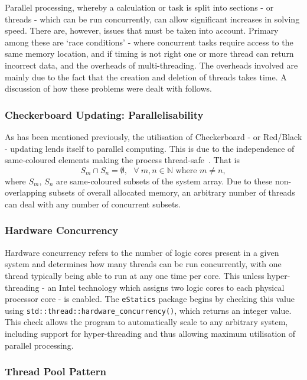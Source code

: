 	Parallel processing, whereby a calculation or task is split into sections - or threads - which can be run concurrently, can allow significant increases in solving speed. There are, however, issues that must be taken into account. Primary among these are `race conditions' - where concurrent tasks require access to the same memory location, and if timing is not right one or more thread can return incorrect data, and the overheads of multi-threading. The overheads involved are mainly due to the fact that the creation and deletion of threads takes time. A discussion of how these problems were dealt with follows.
		
		\subsubsection{Checkerboard Updating: Parallelisability}
		
		As has been mentioned previously, the utilisation of Checkerboard - or Red/Black - updating lends itself to parallel computing. This is due to the independence of same-coloured elements making the process thread-safe~\cite{wallach}. That is 
		\[
		S_m \cap S_n = \emptyset, \ \ \ \forall \  m, n \in \mathbb{N} \text{ where } m \neq n,
		\]
		where $S_m$, $S_n$ are same-coloured subsets of the system array. Due to these non-overlapping subsets of overall allocated memory, an arbitrary number of threads can deal with any number of concurrent subsets.
		
		\subsubsection{Hardware Concurrency}
		
			Hardware concurrency refers to the number of logic cores present in a given system and determines how many threads can be run concurrently, with one thread typically being able to run at any one time per core. This unless hyper-threading - an Intel technology which assigns two logic cores to each physical processor core - is enabled. The \lstinline|eStatics| package begins by checking this value using \lstinline|std::thread::hardware_concurrency()|, which returns an integer value. This check allows the program to automatically scale to any arbitrary system, including support for hyper-threading and thus allowing maximum utilisation of parallel processing.
		
		\subsubsection{Thread Pool Pattern}
		
